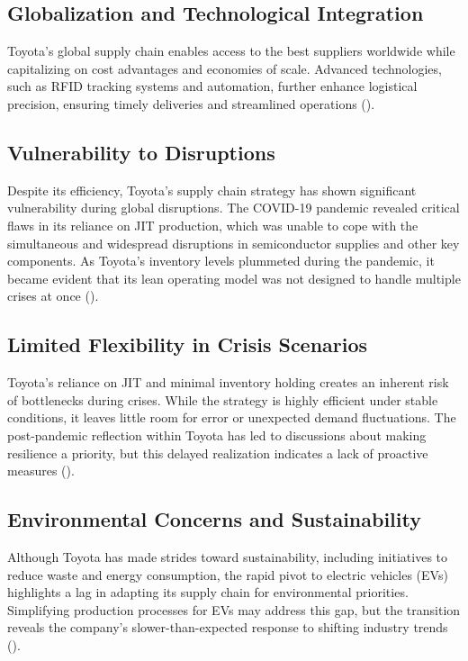 \subsection{Globalization and Technological Integration}
Toyota’s global supply chain enables access to the best suppliers worldwide while capitalizing on cost advantages and economies of scale. Advanced technologies, such as RFID tracking systems and automation, further enhance logistical precision, ensuring timely deliveries and streamlined operations (\cite{everythingsupplychain}).


\subsection{Vulnerability to Disruptions}
Despite its efficiency, Toyota's supply chain strategy has shown significant vulnerability during global disruptions. The COVID-19 pandemic revealed critical flaws in its reliance on JIT production, which was unable to cope with the simultaneous and widespread disruptions in semiconductor supplies and other key components. As Toyota’s inventory levels plummeted during the pandemic, it became evident that its lean operating model was not designed to handle multiple crises at once (\cite{austin2023}).

\subsection{Limited Flexibility in Crisis Scenarios}
Toyota’s reliance on JIT and minimal inventory holding creates an inherent risk of bottlenecks during crises. While the strategy is highly efficient under stable conditions, it leaves little room for error or unexpected demand fluctuations. The post-pandemic reflection within Toyota has led to discussions about making resilience a priority, but this delayed realization indicates a lack of proactive measures (\cite{austin2023}).

\subsection{Environmental Concerns and Sustainability}
Although Toyota has made strides toward sustainability, including initiatives to reduce waste and energy consumption, the rapid pivot to electric vehicles (EVs) highlights a lag in adapting its supply chain for environmental priorities. Simplifying production processes for EVs may address this gap, but the transition reveals the company’s slower-than-expected response to shifting industry trends (\cite{austin2023}).

